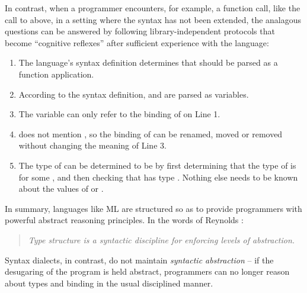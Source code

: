 In contrast, when a programmer encounters, for example, a function call, like the call to  above, in a setting where the syntax has not been extended, the analagous questions can be answered by following library-independent protocols that become ``cognitive reflexes'' after sufficient experience with the language:
\begin{enumerate}
\item The language's syntax definition determines that  should be parsed as a function application.
\item According to the syntax definition,  and  are parsed as variables.
\item The variable  can only refer to the binding of  on Line 1.
\item {} does not mention , so the binding of  can be renamed, moved or removed without changing the meaning of Line 3.
\item The type of  can be determined to be  by first determining that the type of  is  for some , and then checking that  has type . Nothing else needs to be known about the values of  or . 
\end{enumerate}

In summary, languages like ML are structured so as to provide programmers with powerful abstract reasoning principles. In the words of Reynolds \cite{B304}:
\begin{quote}
\emph{Type structure is a syntactic discipline for enforcing levels of abstraction.}
\end{quote}
\noindent
Syntax dialects, in contrast, do not maintain \emph{syntactic abstraction} -- if the desugaring of the program is held abstract, programmers can no longer reason about types and binding in the usual disciplined manner.


